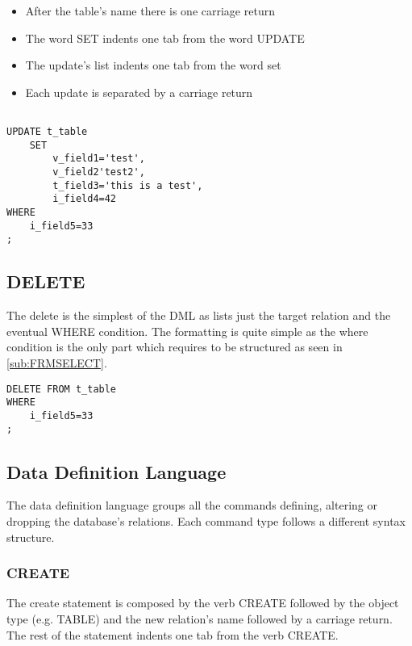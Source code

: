 \begin{itemize}
 \item After the table's name there is one carriage return
 \item The word SET indents one tab from the word UPDATE
 \item The update's list indents one tab from the word set
 \item Each update is separated by a carriage return
\end{itemize}


\begin{lstlisting}[style=pgsql]

UPDATE t_table
	SET
		v_field1='test',
		v_field2'test2',
		t_field3='this is a test',
		i_field4=42
WHERE
	i_field5=33
;

\end{lstlisting}



\subsection{DELETE}
The delete is the simplest of the DML as lists just the target relation and the eventual WHERE condition.
The formatting is quite simple as the where condition is the only part which requires to be structured as seen in 
\ref{sub:FRMSELECT}.

\begin{lstlisting}[style=pgsql]
DELETE FROM t_table
WHERE
	i_field5=33
;
\end{lstlisting}




\subsection{Data Definition Language}
The data definition language groups all the commands defining, altering or dropping the database's relations. Each 
command type follows a different syntax structure.

\subsubsection{CREATE}
The create statement is composed by the verb CREATE followed by the object type (e.g. TABLE) and the new relation's 
name followed by a carriage return. The rest of the statement indents one tab from the verb CREATE.\newline

